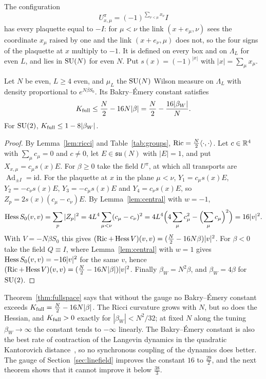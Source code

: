 The configuration
\begin{equation}\label{eq:piflux}
U^\pi_{x,\mu}=(-1)^{\sum_{\nu<\mu}x_\nu}I
\end{equation}
has every plaquette equal to $-I$: for $\mu<\nu$ the link $(x+e_\mu,\nu)$ sees
the coordinate $x_\mu$ raised by one and the link $(x+e_\nu,\mu)$ does not, so
the four signs of the plaquette at $x$ multiply to $-1$. It is defined on every
box and on $\Lambda_L$ for even $L$, and lies in $\mathrm{SU}(N)$ for even $N$. Put
$s(x)=(-1)^{|x|}$ with $|x|=\sum_\mu x_\mu$.

\begin{theorem}\label{thm:fullspace}
Let $N$ be even, $L\ge4$ even, and $\mu_L$ the $\mathrm{SU}(N)$ Wilson measure on
$\Lambda_L$ with density proportional to $e^{N\beta S_0}$. Its Bakry--\'Emery
constant satisfies
\[
K_{\rm full}\le\frac N2-16N|\beta|=\frac N2-\frac{16|\beta_W|}N .
\]
For $\mathrm{SU}(2)$, $K_{\rm full}\le1-8|\beta_W|$.
\end{theorem}

\begin{proof}
By Lemma~\ref{lem:ricci} and Table~\ref{tab:groups}, $\operatorname{Ric}=\frac N2\langle \cdot,\cdot\rangle$.
Let $c\in\mathbb{R}^4$ with $\sum_\mu c_\mu=0$ and $c\ne0$, let $E\in\mathfrak{su}(N)$
with $|E|=1$, and put $X_{x,\mu}=c_\mu s(x)E$. For $\beta\ge0$ take the field
$U^\pi$, at which all transports are $\operatorname{Ad}_{\pm I}=\mathrm{id}$.
For the plaquette at $x$ in the plane $\mu<\nu$, $Y_1=c_\mu s(x)E$,
$Y_2=-c_\nu s(x)E$, $Y_3=-c_\mu s(x)E$ and $Y_4=c_\nu s(x)E$, so $Z_p=2s(x)(c_\mu-
c_\nu)E$. By Lemma~\ref{lem:central} with $w=-1$,
\[
\operatorname{Hess} S_0(v,v)=\sum_p|Z_p|^2=4L^4\sum_{\mu<\nu}(c_\mu-c_\nu)^2=4L^4\Bigl(4\sum_\mu
c_\mu^2-\Bigl(\sum_\mu c_\mu\Bigr)^2\Bigr)=16|v|^2 .
\]
With $V=-N\beta S_0$ this gives $(\operatorname{Ric}+\operatorname{Hess} V)(v,v)=(\frac N2-16N\beta)|v|^2$.
For $\beta<0$ take the field $Q\equiv I$, where Lemma~\ref{lem:central} with
$w=1$ gives $\operatorname{Hess} S_0(v,v)=-16|v|^2$ for the same $v$, hence $(\operatorname{Ric}+\operatorname{Hess} V)(v,
v)=(\frac N2-16N|\beta|)|v|^2$. Finally $\beta_W=N^2\beta$, and $\beta_W=4\beta$
for $\mathrm{SU}(2)$.
\end{proof}

Theorem~\ref{thm:fullspace} says that without the gauge no Bakry--\'Emery
constant exceeds $K_{\rm full}=\frac N2-16N|\beta|$. The Ricci curvature grows
with $N$, but so does the Hessian, and $K_{\rm full}>0$ exactly for
$|\beta_W|<N^2/32$; at fixed $N$ along the tuning $\beta_W\to\infty$ the
constant tends to $-\infty$ linearly. The Bakry--\'Emery constant is also the
best rate of contraction of the Langevin dynamics in the quadratic Kantorovich
distance~\cite{vRS05}, so no synchronous coupling of the dynamics does better.
The gauge of Section~\ref{sec:linefield} improves the constant $16$ to
$\frac{29}2$, and the next theorem shows that it cannot improve it below
$\frac{38}3$.

